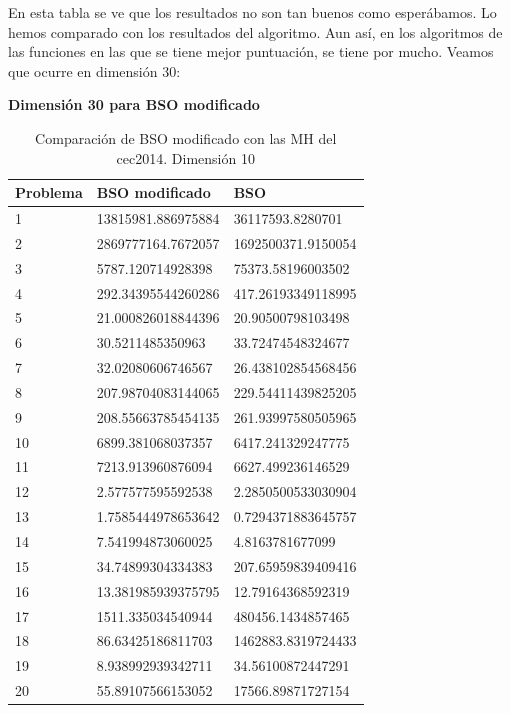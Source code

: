 En esta tabla se ve que los resultados no son tan buenos como esperábamos. Lo hemos comparado con los resultados del algoritmo. Aun así, en los algoritmos de las funciones en las que se tiene mejor puntuación, se tiene por mucho. Veamos que ocurre en dimensión 30:\\


\newpage

\textbf{Dimensión 30 para BSO modificado}
\begin{table}[htbp]
	\begin{center}
		\begin{tabular}{|l|l|l|}
			\hline
			Problema & BSO modificado & BSO \\
			\hline \hline
			1 & 13815981.886975884 & 36117593.8280701 \\ \hline
			2 & 2869777164.7672057 & 1692500371.9150054 \\ \hline
			3 & 5787.120714928398 & 75373.58196003502 \\ \hline
			4 & 292.34395544260286 & 417.26193349118995 \\ \hline
			5 & 21.000826018844396 & 20.90500798103498 \\ \hline
			6 & 30.5211485350963 & 33.72474548324677 \\ \hline
			7 & 32.02080606746567 & 26.438102854568456 \\ \hline
			8 & 207.98704083144065 & 229.54411439825205 \\ \hline
			9 & 208.55663785454135 & 261.93997580505965 \\ \hline
			10 & 6899.381068037357 & 6417.241329247775 \\ \hline
			11 & 7213.913960876094 & 6627.499236146529 \\ \hline
			12 & 2.577577595592538 & 2.2850500533030904 \\ \hline
			13 & 1.7585444978653642 & 0.7294371883645757 \\ \hline
			14 & 7.541994873060025 & 4.8163781677099 \\ \hline
			15 & 34.74899304334383 & 207.65959839409416 \\ \hline
			16 & 13.381985939375795 & 12.79164368592319 \\ \hline
			17 & 1511.335034540944 & 480456.1434857465 \\ \hline
			18 & 86.63425186811703 & 1462883.8319724433 \\ \hline
			19 & 8.938992939342711 & 34.56100872447291 \\ \hline
			20 & 55.89107566153052 & 17566.89871727154 \\ \hline
		\end{tabular}
		\caption{Comparación de BSO modificado con las MH del cec2014. Dimensión 10}
		\label{tabla:Dimension30MejoraComparativa}
	\end{center}
\end{table}

